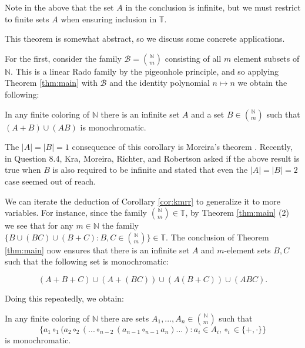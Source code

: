 \documentclass[tocmacros]{daj}
\begin{document}
\vspace{2mm}

Note in the above that the set $A$ in the conclusion is infinite, but we must restrict to finite sets $A$ when ensuring inclusion in $\mathbb{T}$.

This theorem is somewhat abstract, so we discuss some concrete applications.

For the first, consider the family $\mathcal{B}=\binom{\mathbb{N}}{m}$ consisting of all $m$ element subsets of $\mathbb{N}.$  This is a linear Rado family by the pigeonhole principle, and so applying Theorem \ref{thm:main} with $\mathcal{B}$ and the identity polynomial $n\mapsto n$ we obtain the following:

\begin{corollary}\label{cor:kmrr}
In any finite coloring of $\mathbb{N}$ there is an infinite set $A$ and a set $B\in\binom{\mathbb{N}}{m}$ such that $(A+B)\cup (AB)$ is monochromatic. 
\end{corollary}

The $|A|=|B|=1$ consequence of this corollary is Moreira's theorem \cite{moreira2017monochromatic}. Recently, in \cite{kra2022infinite} Question 8.4, Kra, Moreira, Richter, and Robertson asked if the above result is true when $B$ is also required to be infinite and stated that even the $|A|=|B|=2$ case seemed out of reach.

We can iterate the deduction of Corollary \ref{cor:kmrr} to generalize it to more variables.  For instance, since the family $\binom{\mathbb{N}}{m}\in \mathbb{T}$, by Theorem \ref{thm:main} (2) we see that for any $m\in \mathbb{N}$ the family $\{B\cup (BC) \cup (B+C): B,C\in\binom{\mathbb{N}}{m}\}\in \mathbb{T}.$ The conclusion of Theorem \ref{thm:main} now ensures that there is an infinite set $A$ and $m$-element sets $B,C$ such that the following set is monochromatic: 

\begin{equation}\label{example}
(A+B+C)\cup (A+(BC))\cup (A(B+C))\cup (ABC). 
\end{equation}

 Doing this repeatedly, we obtain:

\begin{corollary}\label{cor iterated}
In any finite coloring of $\mathbb{N}$ there are sets $A_1,...,A_n\in\binom{\mathbb{N}}{m}$ such that $$\{a_1\circ_1 (a_2\circ_2(...\circ_{n-2} (a_{n-1}\circ_{n-1} a_n)...): a_i\in A_i, \circ_i\in \{+,\cdot\}\}$$ is monochromatic.
\end{corollary}
\end{document}
